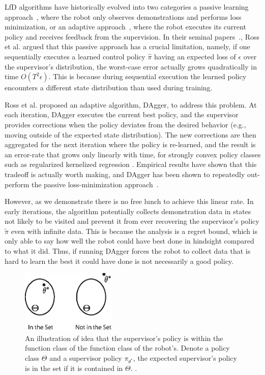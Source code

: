 \documentclass[10pt, conference]{ieeeconf}      %
\begin{document}
LfD algorithms have historically evolved into two categories a passive learning approach~\cite{pomerleau1989alvinn}, where the robot only observes demonstrations and performs loss minimization, or an adaptive approach~\cite{ross2010reduction}, where the robot executes its current policy and receives feedback from the supervision. In their seminal papers~\cite{ross2010efficient,ross2010reduction,ross2013learning}., Ross et al. argued that this passive approach has a crucial limitation, namely,  if one sequentially executes a learned control policy $\hat{\pi}$ having an expected loss of $\epsilon$ over the supervisor's distribution, the worst-case error actually grows quadratically in time $O(T^2\epsilon)$. This is because during sequential execution the learned policy encounters a different state distribution than used during training.

Ross et al. proposed an adaptive algorithm, DAgger, to address this problem.  At each iteration, DAgger executes the current best policy, and the supervisor provides corrections when the policy deviates from the desired behavior (e.g., moving outside of the expected state distribution). The new corrections are then aggregated for the next iteration where the policy is re-learned, and the result is an error-rate that grows only linearly with time, for strongly convex policy classes such as regularized kernelized regression . Empirical results have shown that this tradeoff is actually worth making,  and DAgger has been shown to repeatedly out-perform the passive loss-minimization approach~\cite{ross2010efficient,ross2010reduction,ross2013learning}.

However, as we demonstrate there is no free lunch to achieve this linear rate. In early iterations, the algorithm potentially collects demonstration data in states not likely to be visited and prevent it from ever  recovering the supervisor's policy $\tilde{\pi}$ even with infinite data. This is because the analysis is a regret bound, which is only able to say how well the robot could have best done in hindsight compared to what it did. Thus, if running DAgger forces the robot to collect data that is hard to learn the best it could have done is not necessarily a good policy. 


\begin{figure}
\center
\includegraphics[width=0.4\textwidth]{f_figs/realizibility.eps}
\caption{
    \footnotesize
An illustration of idea that the supervisor's policy is within the function class of the function class of the robot's. Denote a policy class $\Theta$ and a supervisor policy $\pi_{\theta^*}$, the expected supervisor's policy is in the set if it is contained in $\Theta$. .}
\vspace*{-20pt}
\label{fig:teaserl}
\end{figure}
\end{document}
